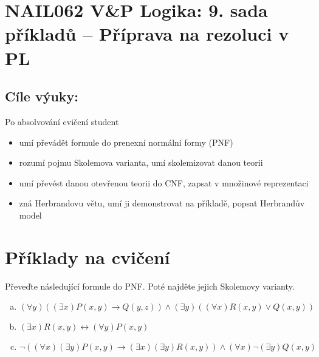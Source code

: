 \section*{NAIL062 V\&P Logika: 9. sada příkladů -- Příprava na rezoluci v PL}


\subsection*{Cíle výuky:} Po absolvování cvičení student

    \begin{itemize}\setlength{\itemsep}{0pt}
        \item umí převádět formule do prenexní normální formy (PNF)
        \item rozumí pojmu Skolemova varianta, umí skolemizovat danou teorii
        \item umí převést danou otevřenou teorii do CNF, zapsat v množinové reprezentaci
        \item zná Herbrandovu větu, umí ji demonstrovat na příkladě, popsat Herbrandův model
    \end{itemize}
    

\section*{Příklady na cvičení}


\begin{problem} 
    
    Převeďte následující formule do PNF. Poté najděte jejich Skolemovy varianty.
    \begin{enumerate}[(a)]
        \item $(\forall y)((\exists x)P(x,y)\to Q(y,z))\wedge (\exists y)((\forall x)R(x,y)\vee Q(x,y))$
        \item $(\exists x)R(x,y)\leftrightarrow (\forall y)P(x,y)$
        \item $\neg((\forall x)(\exists y)P(x,y)\to (\exists x)(\exists y)R(x,y))\wedge(\forall x)\neg(\exists y)Q(x,y)$
    \end{enumerate}

    \begin{solution}
                    
    \end{solution}

\end{problem}



